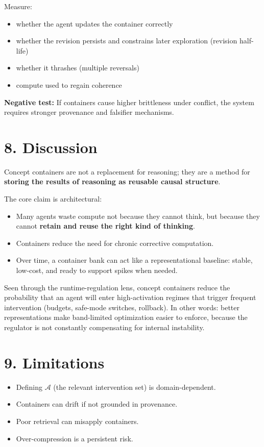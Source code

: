 \documentclass[11pt]{article}
\begin{document}
Measure:
\begin{itemize}
\item whether the agent updates the container correctly
\item whether the revision persists and constrains later exploration (revision half-life)
\item whether it thrashes (multiple reversals)
\item compute used to regain coherence
\end{itemize}

\textbf{Negative test:} If containers cause higher brittleness under conflict, the system requires stronger provenance and falsifier mechanisms.

\section*{8. Discussion}
Concept containers are not a replacement for reasoning; they are a method for \textbf{storing the results of reasoning as reusable causal structure}.

The core claim is architectural:

\begin{itemize}
\item Many agents waste compute not because they cannot think, but because they cannot \textbf{retain and reuse the right kind of thinking}.
\item Containers reduce the need for chronic corrective computation.
\item Over time, a container bank can act like a representational baseline: stable, low-cost, and ready to support spikes when needed.
\end{itemize}

Seen through the runtime-regulation lens, concept containers reduce the probability that an agent will enter high-activation regimes that trigger frequent intervention (budgets, safe-mode switches, rollback). In other words: better representations make band-limited optimization easier to enforce, because the regulator is not constantly compensating for internal instability.


\section*{9. Limitations}
\begin{itemize}
\item Defining \(\mathcal{A}\) (the relevant intervention set) is domain-dependent.
\item Containers can drift if not grounded in provenance.
\item Poor retrieval can misapply containers.
\item Over-compression is a persistent risk.
\end{itemize}
\end{document}
